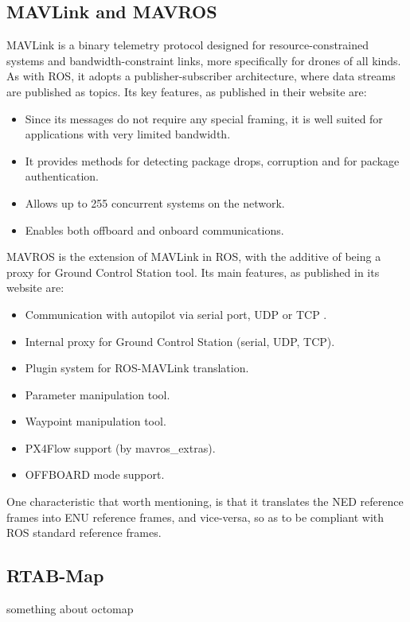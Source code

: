 \subsection{MAVLink and MAVROS}
\label{sssec:chapter2:drone:mavlink}
\nocite{mavlink}
MAVLink is a binary telemetry protocol designed for resource-constrained systems and bandwidth-constraint links, more specifically for drones of all kinds. As with ROS, it adopts a publisher-subscriber architecture, where data streams are published as topics. Its key features, as published in their website are:
\begin{itemize}
    \item Since its messages do not require any special framing, it is well suited for applications with very limited bandwidth.
    \item It provides methods for detecting package drops, corruption and for package authentication.
    \item Allows up to 255 concurrent systems on the network.
    \item Enables both offboard and onboard communications.
\end{itemize}
\nocite{mavros}
MAVROS is the extension of MAVLink in ROS, with the additive of being a proxy for Ground Control Station tool. Its main features, as published in its website are:
\begin{itemize}
    \item Communication with autopilot via serial port, UDP or TCP .
    \item Internal proxy for Ground Control Station (serial, UDP, TCP).
    \item Plugin system for ROS-MAVLink translation.
    \item Parameter manipulation tool.
    \item Waypoint manipulation tool.
    \item PX4Flow support (by mavros\_extras).
    \item OFFBOARD mode support.
\end{itemize}

One characteristic that worth mentioning, is that it translates the \ac{NED} reference frames into \ac{ENU} reference frames, and vice-versa, so as to be compliant with ROS standard reference frames.

\subsection{RTAB-Map}
\label{subsec:chapter1:ros:octomap}
something about octomap

